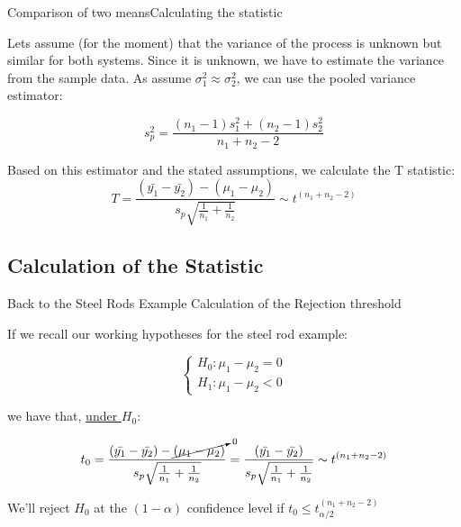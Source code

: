 \begin{frame}{Comparison of two means}{Calculating the statistic}

  Lets assume (for the moment) that the variance of the process is unknown but similar for both systems. Since it is unknown, we have to estimate the variance from the sample data. As assume $\sigma^2_1\approx\sigma^2_2$, we can use the pooled variance estimator:

\begin{equation*}
s_p^2 = \frac{\left(n_1-1\right)s_1^2+\left(n_2-1\right)s_2^2}{n_1+n_2-2}
\end{equation*}
\bigskip

Based on this estimator and the stated assumptions, we calculate the T statistic:
\begin{equation*}
T = \frac{\left(\bar{y_1} - \bar{y_2}\right) - \left(\mu_1 - \mu_2\right)}{s_p\sqrt{\frac{1}{n_1} + \frac{1}{n_2}}}\sim t^{\left(n_1+n_2-2\right)}
\end{equation*}
\end{frame}

\subsection{Calculation of the Statistic}

\begin{frame}
{Back to the Steel Rods Example}
{Calculation of the Rejection threshold}

If we recall our working hypotheses for the steel rod example:

\begin{equation*}
\begin{cases}
H_0: \mu_1 - \mu_2 = 0\\
H_1: \mu_1 - \mu_2 < 0
\end{cases}
\end{equation*}

\noindent we have that, \underline{under $H_0$}:

\begin{equation*}
t_0 = \frac{\left(\bar{y_1} - \bar{y_2}\right) - \cancelto{0}{\left(\mu_1 - \mu_2\right)}}{s_p\sqrt{\frac{1}{n_1} + \frac{1}{n_2}}} = \frac{\left(\bar{y_1} - \bar{y_2}\right)}{s_p\sqrt{\frac{1}{n_1} + \frac{1}{n_2}}}\sim t^{\left(n_1+n_2-2\right)}
\end{equation*}

We'll reject $H_0$ at the $(1-\alpha)$ confidence level if $t_0\leq t^{(n_1+n_2-2)}_{\alpha/2}$
\end{frame}

